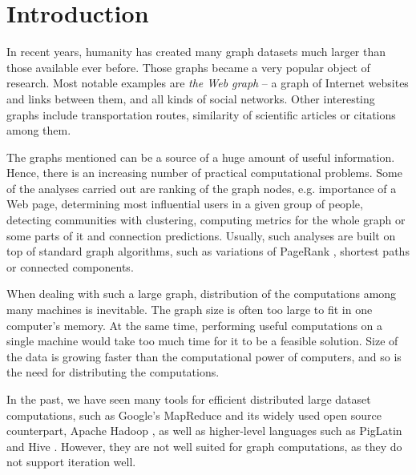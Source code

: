 
\chapter{Introduction}
In recent years, humanity has created many graph datasets much larger than those available ever before.
Those graphs became a very popular object of research. Most notable examples are \emph{the Web graph} -- a graph of Internet websites and links between them, and all kinds of social networks. Other interesting graphs include transportation routes, similarity of scientific articles or citations among them.


The graphs mentioned can be a source of a huge amount of useful information. Hence, there is an increasing number of practical computational problems.
Some of the analyses carried out are ranking of the graph nodes, e.g. importance of a Web page, determining most influential users in a given group of people, detecting communities with clustering, computing metrics for the whole graph or some parts of it and connection predictions.
Usually, such analyses are built on top of standard graph algorithms, such as variations of PageRank \cite{pagerank}, shortest paths or connected components.

When dealing with such a large graph, distribution of the computations among many machines is inevitable. The graph size is often too large to fit in one computer's memory. At the same time, performing useful computations on a single machine would take too much time for it to be a feasible solution. Size of the data is growing faster than the computational power of computers, and so is the need for distributing the computations.

In the past, we have seen many tools for efficient distributed large dataset computations, such as Google's MapReduce \cite{mapreduce} and its widely used open source counterpart, Apache Hadoop \cite{hadoop}, as well as higher-level languages such as PigLatin \cite{piglatin} and Hive \cite{hive}. However, they are not well suited for graph computations, as they do not support iteration well.

